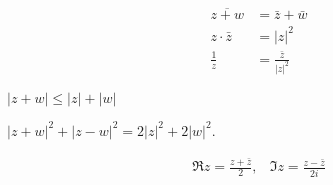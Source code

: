 \begin{align*}
\overline{z+w} &=\bar z + \bar w\\
z\cdot\bar z&=|z|^2\\
\frac{1}{z}&=\frac{\bar z}{|z|^2}
\end{align*}
\begin{proposition}
$|z+w|\le|z|+|w|$
\end{proposition}
\begin{proposition}
$|z+w|^2+|z-w|^2=2|z|^2+2|w|^2$.
\end{proposition}
\begin{proposition}
\begin{eqnarray*}
\Re z=\frac{z+\bar z}{2},
&
\Im z=\frac{z-\bar z}{2i}
\end{eqnarray*}
\end{proposition}


















